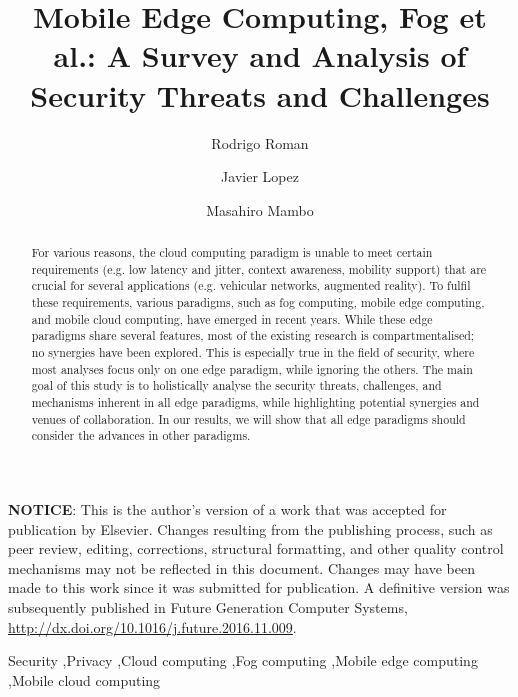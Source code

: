 \documentclass[twocolumn,preprint,3p]{elsarticle}
\begin{document}
\onecolumn
\begin{tcolorbox}
\textbf{NOTICE}: This is the author's version of a work that was accepted for publication by Elsevier. Changes resulting from the publishing process, such as peer review, editing, corrections, structural formatting, and other quality control mechanisms may not be reflected in this document. Changes may have been made to this work since it was submitted for publication. A definitive version was subsequently published in Future Generation Computer Systems, \url{http://dx.doi.org/10.1016/j.future.2016.11.009}.
\end{tcolorbox}
\twocolumn

\begin{frontmatter}





\title{Mobile Edge Computing, Fog et al.: A Survey and Analysis of Security Threats and Challenges}




\author[es]{Rodrigo Roman}

\author[es]{Javier Lopez}

\author[jp]{Masahiro Mambo}

\address[es]{Computer Science Department, University of Malaga, Ada Byron building, 29071 Malaga, Spain.}
\address[jp]{Faculty of Electrical and Computer Engineering, Institute of Science and Engineering, Kanazawa University, Kakuma Kanazawa 920-1192, Japan.}

\begin{abstract}
For various reasons, the cloud computing paradigm is unable to meet certain requirements (e.g. low latency and jitter, context awareness, mobility support) that are crucial for several applications (e.g. vehicular networks, augmented reality). To fulfil these requirements, various paradigms, such as fog computing, mobile edge computing, and mobile cloud computing, have emerged in recent years. While these edge paradigms share several features, most of the existing research is compartmentalised; no synergies have been explored. This is especially true in the field of security, where most analyses focus only on one edge paradigm, while ignoring the others. The main goal of this study is to holistically analyse the security threats, challenges, and mechanisms inherent in all edge paradigms, while highlighting potential synergies and venues of collaboration. In our results, we will show that all edge paradigms should consider the advances in other paradigms.
\end{abstract}

\begin{keyword}
Security \sep Privacy \sep Cloud computing \sep Fog computing \sep Mobile edge computing \sep Mobile cloud computing
\end{keyword}

\end{frontmatter}
\end{document}
